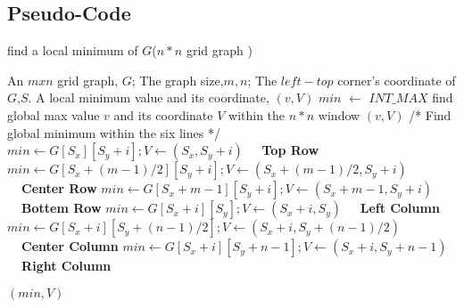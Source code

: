 \documentclass[UTF8,a4paper]{article}
\begin{document}
	\subsection{Pseudo-Code}
	\begin{algorithm}[htb]
		\caption{find a local minimum of $G$($ n * n $ grid graph )}
		\begin{algorithmic}[1]
			\Require
			An $ m x n $ grid graph, $ G $;
			The graph size,$ m,n $;
			The $ left-top $ corner's coordinate of $ G $,$ S $.
			\Ensure
			A local minimum value and its coordinate, $ (v,V) $
				\State $ min $ $\gets$ $ INT\_MAX $
					\State find global max value $v$ and its coordinate $V$ within the $ n * n $ window
					\State \Return $(v,V)$
				\EndIf
				\State /* Find global minimum within the six lines */
						$ min \gets G[S_{x}][S_{y}+i]; V \gets (S_{x},S_{y}+i) $ 
					\EndIf \textbf{\color{red}\ \ Top Row} 
						$ min \gets G[S_{x}+(m-1)/2][S_{y}+i]; V \gets (S_{x}+(m-1)/2,S_{y}+i) $ 
					\EndIf\textbf{\color{red}\ \  Center Row}
						$ min \gets G[S_{x}+m-1][S_{y}+i]; V \gets (S_{x}+m-1,S_{y}+i) $ 
					\EndIf\textbf{\color{red}\ \ Bottem Row}
				\EndFor
						$ min \gets G[S_{x}+i][S_{y}]; V \gets (S_{x}+i,S_{y}) $ 
					\EndIf\textbf{\color{red}\ \ Left Column}
					    $ min \gets G[S_{x}+i][S_{y}+(n-1)/2]; V \gets (S_{x}+i,S_{y}+(n-1)/2) $ 
					\EndIf\textbf{\color{red}\ \ Center Column}
						$ min \gets G[S_{x}+i][S_{y}+n-1]; V \gets (S_{x}+i,S_{y}+n-1) $ 
					\EndIf\textbf{\color{red}\ \ Right Column}
				\EndFor
				
					\State \Return $ (min,V) $
				\EndIf
				

\end{algorithmic}
\end{algorithm}
\end{document}

